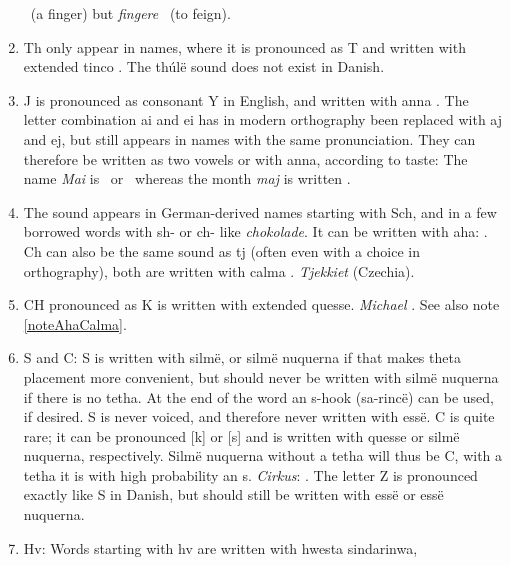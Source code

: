 \documentclass[a4paper]{article}
\begin{document}
\begin{enumerate}
    \Tformen\Tnwalme\TTdot\Toore\TTacute ~(a finger) but
    \emph{fingere}
    \Tformen\Tungwe\TTnasalizer\TTdot\Troomen\TTacute\Ttelco\TTacute
    ~(to feign).\label{noteNG}
\item Th only appear in names, where it is pronounced as T and written
  with extended tinco \Textendedtinco.  The th\'ul\"e sound
  \textipa{[T]} does not exist in Danish.\label{noteTH}
\item J is pronounced as consonant Y in English, and written with anna
  \Tanna.  The letter combination ai and ei has in modern orthography
  been replaced with aj and ej, but still appears in names with the
  same pronunciation.  They can therefore be written as two vowels or
  with anna, according to taste: The name \emph{Mai} is
  \Tmalta\Ttelco\TTthreedots\Ttelco\TTdot ~or \Tmalta\Tanna\TTdot
  ~whereas the month \emph{maj} is written
  \Tmalta\Tanna\TTdot.\label{noteJ}
\item The sound \textipa{[S]} appears in German-derived names starting
  with Sch, and in a few borrowed words with sh- or ch- like
  \emph{chokolade}.  It can be written with aha:
  \Taha\Tquesse\TTrightcurl\Tlambe\TTrightcurl\Tanto\TTthreedots\TTdotbelow.
  Ch can also be the same sound as tj
  \textipa{[tS]} (often even with a choice in orthography), both are
  written with calma \Tcalma.\label{noteAhaCalma}  \emph{Tjekkiet}
  \Tcalma\Tquesse\TTacute\TTdoubler\Ttelco\TTdot\Ttinco\TTacute\Ts
  (Czechia).
\item CH pronounced as K is written with extended quesse.
  \emph{Michael}
  \Tmalta\Textendedquesse\TTdot\Ttelco\TTthreedots\TTdotbelow\Tlambe.
  See also note \ref{noteAhaCalma}. \label{noteCHasK}
\item S and C: S is written with silm\"e, or silm\"e nuquerna if that
  makes theta placement more convenient, but should never be written
  with silm\"e nuquerna if there is no tetha. At the end of the word
  an s-hook (sa-rinc\"e) can be used, if desired. S is never voiced,
  and therefore never written with ess\"e.  C is quite rare; it
  can be pronounced [k] or [s] and is written with quesse or silm\"e
  nuquerna, respectively.  Silm\"e nuquerna without a tetha will thus
  be C, with a tetha it is with high probability an s.  \emph{Cirkus}:
  \Tsilmenuquerna\Toore\TTdot\Tquesse\Tsilmenuquerna\TTrightcurl.\label{noteCS}
  The letter Z is pronounced exactly like S in Danish, but should still
  be written with ess\"e or ess\"e nuquerna.
\item Hv: Words starting with hv are written with hwesta sindarinwa,

\end{enumerate}
\end{document}
